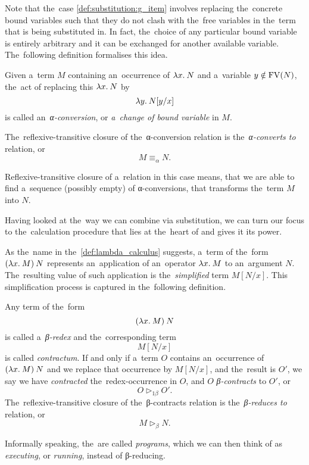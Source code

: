 Note that the~case \ref{def:substitution:g_item} involves replacing the~concrete
bound variables such that they do not clash with the~free variables in the~term
that is being substituted in. In fact, the~choice of any particular bound
variable is entirely arbitrary and it can be exchanged for another available
variable. The~following definition formalises this idea.

\begin{definition}
  Given a~term $M$ containing an~occurrence of $\lambda x . \: N$ and a~variable $y
  \notin \mathrm{FV}(N)$, the~act of replacing this $\lambda x . \: N$ by
  \[
    \lambda y . \: N[y/x]
  \]
  is called an~\emph{α-conversion}, or \emph{a~change of bound variable} in $M$.

  The~reflexive-transitive closure of the~α-conversion relation is
  the~\emph{α-converts to} relation, or
  \[
    M \equiv_\alpha N.
  \]
\end{definition}

Reflexive-transitive closure of a~relation in this case means, that we are able
to find a~sequence (possibly empty) of α-conversions, that transforms the~term
$M$ into $N$.

Having looked at the~way we can combine \lts via substitution, we can turn our
focus to the~calculation procedure that lies at the~heart of \lc and gives it
its power.


As the~name in the~\autoref{def:lambda_calculus} suggests, a~term of
the~form $(\lambda x . \: M) \: N$ represents an~application of an~operator $\lambda x . \: M$
to an~argument $N$. The~resulting value of such application is
the~\emph{simplified} term $M[N/x]$. This simplification process is captured in
the~following definition.

\begin{definition}
  Any term of the~form
  \[
    (\lambda x . \: M) \: N
  \]
  is called a~\emph{β-redex} and the~corresponding term
  \[
    M[N/x]
  \]
  is called \emph{contractum}. If and only if a~term $O$ contains an~occurrence
  of $(\lambda x . \: M) \: N$ and we replace that occurrence by $M[N/x]$, and
  the~result is $O'$, we say we have \emph{contracted} the~redex-occurrence in
  $O$, and $O$ \emph{β-contracts} to $O'$, or
  \[
    O \triangleright_{1\beta} O'.
  \]
  The~reflexive-transitive closure of the~β-contracts relation is
  the~\emph{β-reduces to} relation, or
  \[
    M \triangleright_\beta N.
  \]
\end{definition}

Informally speaking, the~\lts are called \emph{programs}, which we can then
think of as \emph{executing}, or \emph{running}, instead of β-reducing.

